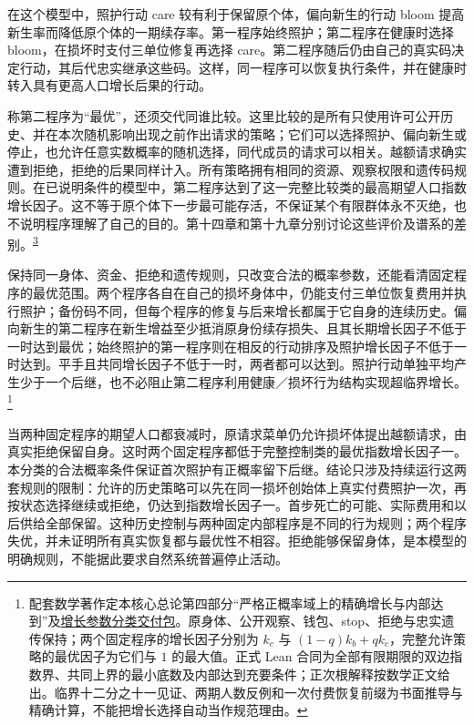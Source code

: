 \documentclass[
  11pt,
  oneside]{book}
\begin{document}
在这个模型中，照护行动 care 较有利于保留原个体，偏向新生的行动 bloom 提高新生率而降低原个体的一期续存率。第一程序始终照护；第二程序在健康时选择 bloom，在损坏时支付三单位修复再选择 care。第二程序随后仍由自己的真实码决定行动，其后代忠实继承这些码。这样，同一程序可以恢复执行条件，并在健康时转入具有更高人口增长后果的行动。

称第二程序为``最优''，还须交代同谁比较。这里比较的是所有只使用许可公开历史、并在本次随机影响出现之前作出请求的策略；它们可以选择照护、偏向新生或停止，也允许任意实数概率的随机选择，同代成员的请求可以相关。越额请求确实遭到拒绝，拒绝的后果同样计入。所有策略拥有相同的资源、观察权限和遗传码规则。在已说明条件的模型中，第二程序达到了这一完整比较类的最高期望人口指数增长因子。这不等于原个体下一步最可能存活，不保证某个有限群体永不灭绝，也不说明程序理解了自己的目的。第十四章和第十九章分别讨论这些评价及谱系的差别。\textsuperscript{\hyperlink{ph-note-3}{3}}

保持同一身体、资金、拒绝和遗传规则，只改变合法的概率参数，还能看清固定程序的最优范围。两个程序各自在自己的损坏身体中，仍能支付三单位恢复费用并执行照护；备份码不同，但每个程序的修复与后来增长都属于它自身的连续历史。偏向新生的第二程序在新生增益至少抵消原身份续存损失、且其长期增长因子不低于一时达到最优；始终照护的第一程序则在相反的行动排序及照护增长因子不低于一时达到。平手且共同增长因子不低于一时，两者都可以达到。照护行动单独平均产生少于一个后继，也不必阻止第二程序利用健康／损坏行为结构实现超临界增长。\footnote{\hypertarget{ph-note-19}{}配套数学著作定本核心总论第四部分``严格正概率域上的精确增长与内部达到''及\href{https://github.com/MurphyHoops/UEOT/blob/3d443ec29eb17af1fc00699a74e2d42d73516d81/formalization/ueot-core/docs/compression/theory_completion/unified_closure/core_growth_classification_v1/README.md}{增长参数分类交付包}。原身体、公开观察、钱包、stop、拒绝与忠实遗传保持；两个固定程序的增长因子分别为 \(k_c\) 与 \((1-q)k_b+qk_c\)，完整允许策略的最优因子为它们与 \(1\) 的最大值。正式 Lean 合同为全部有限期限的双边指数界、共同上界的最小底数及内部达到充要条件；正次根解释按数学正文给出。临界十二分之十一见证、两期人数反例和一次付费恢复前缀为书面推导与精确计算，不能把增长选择自动当作规范理由。}

当两种固定程序的期望人口都衰减时，原请求菜单仍允许损坏体提出越额请求，由真实拒绝保留自身。这时两个固定程序都低于完整控制类的最优指数增长因子一。本分类的合法概率条件保证首次照护有正概率留下后继。结论只涉及持续运行这两套规则的限制：允许的历史策略可以先在同一损坏创始体上真实付费照护一次，再按状态选择继续或拒绝，仍达到指数增长因子一。首步死亡的可能、实际费用和以后供给全部保留。这种历史控制与两种固定内部程序是不同的行为规则；两个程序失优，并未证明所有真实恢复都与最优性不相容。拒绝能够保留身体，是本模型的明确规则，不能据此要求自然系统普遍停止活动。
\end{document}
